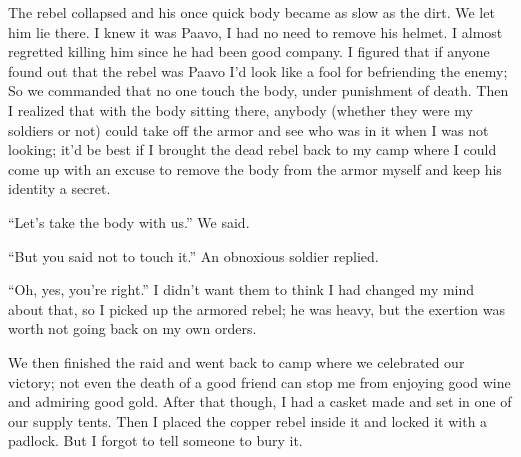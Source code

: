 The rebel collapsed and his once quick body became as slow as the dirt. We let him lie there. I knew it was Paavo, I had no need to remove his helmet. I almost regretted killing him since he had been good company.
I figured that if anyone found out that the rebel was Paavo I'd look like a fool for befriending the enemy;
So we commanded that no one touch the body, under punishment of death. Then I realized that with the body sitting there, anybody (whether they were my soldiers or not) could take off the armor and see who was in it when I was not looking; it'd be best if I brought the dead rebel back to my camp where I could come up with an excuse to remove the body from the armor myself and keep his identity a secret.

``Let's take the body with us.'' We said.

``But you said not to touch it.'' An obnoxious soldier replied.

``Oh, yes, you're right.'' I didn't want them to think I had changed my mind about that, so I picked up the armored rebel; he was heavy, but the exertion was worth not going back on my own orders.

We then finished the raid and went back to camp where we celebrated our victory; not even the death of a good friend can stop me from enjoying good wine and admiring good gold. After that though, I had a casket made and set in one of our supply tents. Then I placed the copper rebel inside it and locked it with a padlock. But I forgot to tell someone to bury it.
